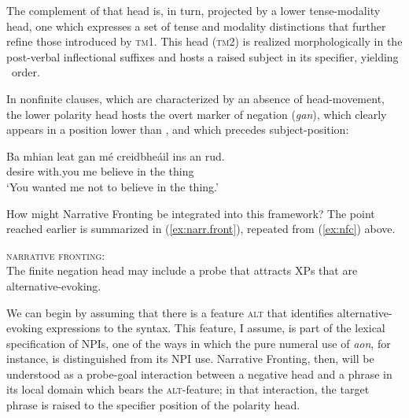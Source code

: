 \documentclass[output=paper,colorlinks,citecolor=brown]{langscibook}
\begin{document}
\noindent The complement of that head is, in turn, projected by a lower tense-modality head, one which expresses a set of tense and modality distinctions that further refine those introduced by \textsc{tm1}.  This head (\textsc{tm2}) is realized morphologically in the post-verbal inflectional suffixes and hosts a raised subject in its specifier, yielding \vso\ order.

In nonfinite clauses, which are characterized by an absence of head-movement, the lower polarity head hosts the overt marker of negation (\textit{gan}), which clearly appears in a position lower than \C, and which precedes subject-position:

\ea
\gll Ba mhian leat gan mé creidbheáil ins an rud. \\
    {\ba} desire with.you {\gan} me {believe\vn} in the thing \\
\glt `You wanted me not to believe in the thing.'
\z


How might Narrative Fronting be integrated into this framework? The point reached earlier is summarized in (\ref{ex:narr.front}), repeated from (\ref{ex:nfc}) above.

\ea\label{ex:narr.front}
{\scshape narrative fronting}: \\
The finite negation head may include a probe that attracts XPs that are alternative-evoking.
\z


We can begin by assuming that there is a feature \textsc{alt} that identifies alternative-evoking expressions to the syntax. This feature, I assume, is part of the lexical specification of NPIs, one of the ways in which the pure numeral use of \textit{aon}, for instance, is distinguished from its NPI use. Narrative Fronting, then, will be understood as a probe-goal interaction between a negative head and a phrase in its local domain which bears the \textsc{alt}-feature; in that interaction, the target phrase is raised to the specifier position of the polarity head. 
\end{document}
